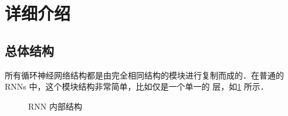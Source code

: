 
\newcommand{\inlinesymbol}[2]{%
  \tikz[baseline = -0.7ex]{\node[#1, scale = 0.7] {#2};}%
}

\clearpage
\section{\lstm{} 详细介绍}
\subsection{\lstm{} 总体结构}
所有循环神经网络结构都是由完全相同结构的模块进行复制而成的．在普通的RNNs 中，这个模块结构非常简单，比如仅是一个单一的 \inlinesymbol{rectangle operator}{$\tanh$} 层，如\cref{fig:Inner Structure of RNN} 所示．%
%
\begin{figure}[!htb]
  \centering
  \scalebox{0.7}{}
  \caption{RNN 内部结构}
  \label{fig:Inner Structure of RNN}
\end{figure}

